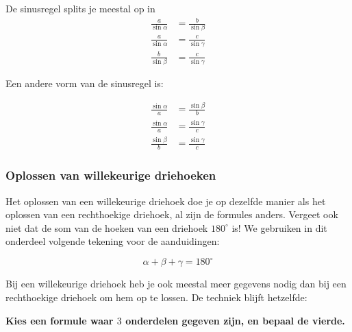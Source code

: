 De sinusregel splits je meestal op in
\begin{align*}
\frac{a}{\sin \alpha} &= \frac{b}{\sin \beta}\\
\frac{a}{\sin \alpha} &= \frac{c}{\sin \gamma}\\
\frac{b}{\sin \beta} &= \frac{c}{\sin \gamma}
\end{align*}

Een andere vorm van de sinusregel is:

\begin{align*}
\frac{\sin \alpha}{a} &= \frac{\sin \beta}{b}\\
\frac{\sin \alpha}{a} &= \frac{\sin \gamma}{c}\\
\frac{\sin \beta}{b} &= \frac{\sin \gamma}{c}
\end{align*}

\subsubsection{Oplossen van willekeurige driehoeken}

Het oplossen van een willekeurige driehoek doe je op dezelfde manier als het oplossen van een rechthoekige driehoek, al zijn de formules anders.  Vergeet ook niet dat de som van de hoeken van een driehoek $180^\circ$ is! We gebruiken in dit onderdeel volgende tekening voor de aanduidingen:

\begin{figure}[H]
	\centering 
	 
\end{figure}
\[\alpha + \beta + \gamma = 180^\circ\]

Bij een willekeurige driehoek heb je ook meestal meer gegevens nodig dan bij een rechthoekige driehoek om hem op te lossen.  De techniek blijft hetzelfde:
\begin{center}
\textbf{Kies een formule waar $3$ onderdelen gegeven zijn, en bepaal de vierde.}
\end{center}

